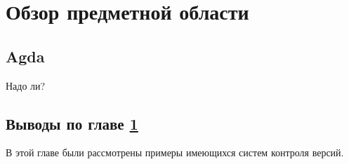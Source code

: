 \chapter{Обзор предметной области}
\label{chapter1}





\section{Agda}

Надо ли?

\section{Выводы по главе \ref{chapter1}}

В этой главе были рассмотрены примеры имеющихся систем контроля версий.